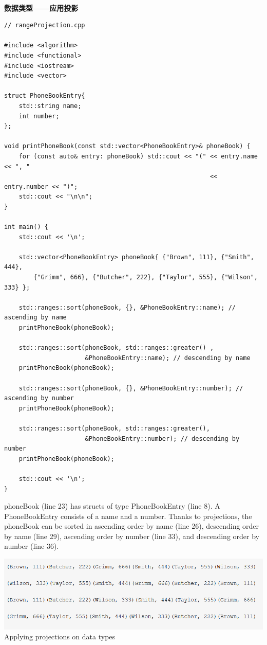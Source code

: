 \hspace*{\fill} \\ %
\noindent
\textbf{数据类型——应用投影}
\begin{lstlisting}[style=styleCXX]
// rangeProjection.cpp

#include <algorithm>
#include <functional>
#include <iostream>
#include <vector>

struct PhoneBookEntry{
	std::string name;
	int number;
};

void printPhoneBook(const std::vector<PhoneBookEntry>& phoneBook) {
	for (const auto& entry: phoneBook) std::cout << "(" << entry.name << ", "
	                                                    << entry.number << ")";
	std::cout << "\n\n";
}

int main() {
	std::cout << '\n';
	
	std::vector<PhoneBookEntry> phoneBook{ {"Brown", 111}, {"Smith", 444},
		{"Grimm", 666}, {"Butcher", 222}, {"Taylor", 555}, {"Wilson", 333} };
	
	std::ranges::sort(phoneBook, {}, &PhoneBookEntry::name); // ascending by name
	printPhoneBook(phoneBook);
	
	std::ranges::sort(phoneBook, std::ranges::greater() ,
	                  &PhoneBookEntry::name); // descending by name
	printPhoneBook(phoneBook);
	
	std::ranges::sort(phoneBook, {}, &PhoneBookEntry::number); // ascending by number
	printPhoneBook(phoneBook);
	
	std::ranges::sort(phoneBook, std::ranges::greater(),
	                  &PhoneBookEntry::number); // descending by number
	printPhoneBook(phoneBook);
	
	std::cout << '\n';
}
\end{lstlisting}

phoneBook (line 23) has structs of type PhoneBookEntry (line 8). A PhoneBookEntry consists of a name and a number. Thanks to projections, the phoneBook can be sorted in ascending order by name (line 26), descending order by name (line 29), ascending order by number (line 33), and descending order by number (line 36).

\begin{center}
\includegraphics[width=1.0\textwidth]{content/3/chapter5/images/1-1.png}\\
Applying projections on data types
\end{center}

